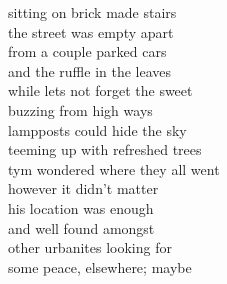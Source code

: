 sitting on brick made stairs\\
the street was empty apart\\
from a couple parked cars\\
and the ruffle in the leaves\\
while lets not forget the sweet\\

buzzing from high ways\\
lampposts could hide the sky\\
teeming up with refreshed trees\\
tym wondered where they all went\\

however it didn't matter\\
his location was enough\\
and well found amongst\\
other urbanites looking for\\
some peace, elsewhere; maybe
